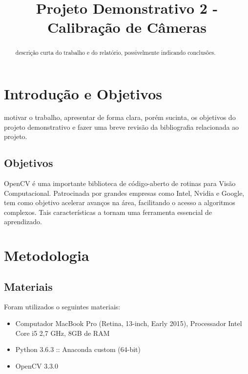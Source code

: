 \documentclass[conference]{IEEEtran}
\begin{document}
\title{Projeto Demonstrativo 2 - Calibração de Câmeras}

\author{
}

\maketitle

\begin{abstract}
descrição curta do trabalho e do relatório, possivelmente indicando conclusões.
\end{abstract}


\section{Introdução e Objetivos}
motivar o trabalho, apresentar de forma clara, porém sucinta, os objetivos do projeto demonstrativo e fazer uma breve revisão da bibliografia relacionada ao projeto.
\subsection{Objetivos}
OpenCV é uma importante biblioteca de código-aberto de rotinas para Visão Computacional\cite{forsyth}.  Patrocinada por grandes empresas como Intel, Nvidia e Google, tem como objetivo acelerar avanços na área, facilitando o acesso a algoritmos complexos\cite{opencv_library}. Tais características a tornam uma ferramenta essencial de aprendizado.

\section{Metodologia}


\subsection{Materiais}

Foram utilizados o seguintes materiais:
\begin{itemize}
\item Computador MacBook Pro (Retina, 13-inch, Early 2015), Processador Intel Core i5 2,7 GHz, 8GB de RAM
\item Python 3.6.3 :: Anaconda custom (64-bit)
\item OpenCV 3.3.0
\end{itemize}
\end{document}
